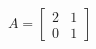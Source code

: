 \documentclass[preview]{standalone}
\begin{document}
\begin{align*}
A = \begin{bmatrix} 2 & 1 \\ 0 & 1 \end{bmatrix}
\end{align*}
\end{document}
